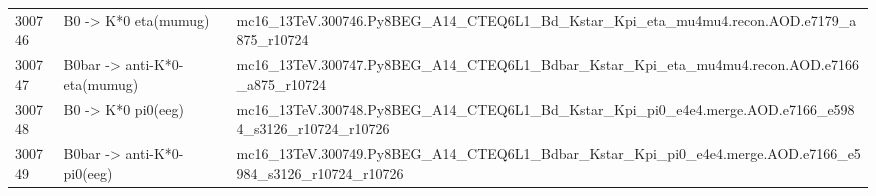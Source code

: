 \begin{table}[ht]
{\begin{tabular}{l l l}
300746 & B0 -> K*0 eta(mumug) & mc16\_13TeV.300746.Py8BEG\_A14\_CTEQ6L1\_Bd\_Kstar\_Kpi\_eta\_mu4mu4.recon.AOD.e7179\_a875\_r10724 \\
300747 & B0bar -> anti-K*0- eta(mumug) & mc16\_13TeV.300747.Py8BEG\_A14\_CTEQ6L1\_Bdbar\_Kstar\_Kpi\_eta\_mu4mu4.recon.AOD.e7166\_a875\_r10724 \\
300748 & B0 -> K*0 pi0(eeg) & mc16\_13TeV.300748.Py8BEG\_A14\_CTEQ6L1\_Bd\_Kstar\_Kpi\_pi0\_e4e4.merge.AOD.e7166\_e5984\_s3126\_r10724\_r10726 \\
300749 & B0bar -> anti-K*0- pi0(eeg) & mc16\_13TeV.300749.Py8BEG\_A14\_CTEQ6L1\_Bdbar\_Kstar\_Kpi\_pi0\_e4e4.merge.AOD.e7166\_e5984\_s3126\_r10724\_r10726 \\
\hline
\end{tabular} 
}
\label{app:tab:data:bkg}
\end{table}
